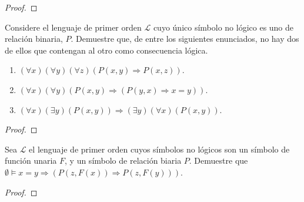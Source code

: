 \documentclass[12pt]{report}
\newcounter{it}
\theoremstyle{largebreak}
\begin{document}
    \begin{proof}
    \end{proof}

    \begin{excer}
        Considere el lenguaje de primer orden $\mathcal{L}$ cuyo único símbolo no lógico es uno de relación binaria, $P$. Demuestre que, de entre los siguientes enunciados, no hay dos de ellos que contengan al otro como consecuencia lógica.
        \begin{enumerate}[label=$(\alph*)$]
            \item $(\forall x)(\forall y)(\forall z)(P(x,y)\Rightarrow P(x,z))$.
            \item $(\forall x)(\forall y)(P(x,y)\Rightarrow (P(y,x)\Rightarrow x=y))$.
            \item $(\forall x)(\exists y)(P(x,y))\Rightarrow(\exists y)(\forall x)(P(x,y))$.
        \end{enumerate} 
    \end{excer}

    \begin{proof}
    \end{proof}

    \begin{excer}
        Sea $\mathcal{L}$ el lenguaje de primer orden cuyos símbolos no lógicos son un símbolo de función unaria $F$, y un símbolo de relación biaria $P$. Demuestre que $\emptyset\vDash x=y\Rightarrow(P(z,F(x))\Rightarrow P(z,F(y)))$.
    \end{excer}

    \begin{proof}
    \end{proof}
\end{document}
